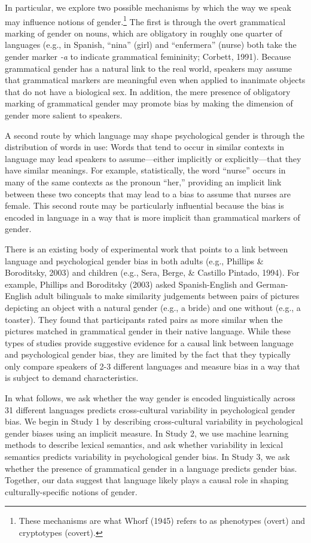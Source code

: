 \documentclass[10pt, letterpaper]{article}
\begin{document}
In particular, we explore two possible mechanisms by which the way we
speak may influence notions of
gender.\footnote{These mechanisms are what Whorf (1945) refers to as phenotypes (overt) and cryptotypes (covert).}
The first is through the overt grammatical marking of gender on nouns,
which are obligatory in roughly one quarter of languages (e.g., in
Spanish, ``nina'' (girl) and ``enfermera'' (nurse) both take the gender
marker \emph{-a} to indicate grammatical femininity; Corbett, 1991).
Because grammatical gender has a natural link to the real world,
speakers may assume that grammatical markers are meaningful even when
applied to inanimate objects that do not have a biological sex. In
addition, the mere presence of obligatory marking of grammatical gender
may promote bias by making the dimension of gender more salient to
speakers.

A second route by which language may shape psychological gender is
through the distribution of words in use: Words that tend to occur in
similar contexts in language may lead speakers to assume---either
implicitly or explicitly---that they have similar meanings. For example,
statistically, the word ``nurse'' occurs in many of the same contexts as
the pronoun ``her,'' providing an implicit link between these two
concepts that may lead to a bias to assume that nurses are female. This
second route may be particularly influential because the bias is encoded
in language in a way that is more implicit than grammatical markers of
gender.

There is an existing body of experimental work that points to a link
between language and psychological gender bias in both adults (e.g.,
Phillips \& Boroditsky, 2003) and children (e.g., Sera, Berge, \&
Castillo Pintado, 1994). For example, Phillips and Boroditsky (2003)
asked Spanish-English and German-English adult bilinguals to make
similarity judgements between pairs of pictures depicting an object with
a natural gender (e.g., a bride) and one without (e.g., a toaster). They
found that participants rated pairs as more similar when the pictures
matched in grammatical gender in their native language. While these
types of studies provide suggestive evidence for a causal link between
language and psychological gender bias, they are limited by the fact
that they typically only compare speakers of 2-3 different languages and
measure bias in a way that is subject to demand characteristics.

In what follows, we ask whether the way gender is encoded linguistically
across 31 different languages predicts cross-cultural variability in
psychological gender bias. We begin in Study 1 by describing
cross-cultural variability in psychological gender biases using an
implicit measure. In Study 2, we use machine learning methods to
describe lexical semantics, and ask whether variability in lexical
semantics predicts variability in psychological gender bias. In Study 3,
we ask whether the presence of grammatical gender in a language predicts
gender bias. Together, our data suggest that language likely plays a
causal role in shaping culturally-specific notions of gender.
\end{document}
